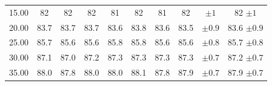 \documentclass[11pt]{article}
\begin{document}
\begin{table}[h]
\begin{tabular}{cccccccccc}
15.00                                                 & 82                                             & 82                                             & 82                                             & 81                                             & 82                                             & 81                                             & 82                                             & $\pm 1$                                                          & 82 $\pm 1$                                                     \\
\rowcolor[HTML]{EFEFEF} 
20.00                                                 & 83.7                                             & 83.7                                             & 83.7                                             & 83.6                                             & 83.8                                             & 83.6                                             & 83.5                                             & $\pm 0.9$                                                          & 83.6  $\pm 0.9$                                                    \\
25.00                                                 & 85.7                                             & 85.6                                             & 85.6                                             & 85.8                                             & 85.8                                             & 85.6                                             & 85.6                                             & $\pm 0.8$                                                          & 85.7 $\pm 0.8$                                                     \\
\rowcolor[HTML]{EFEFEF} 
30.00                                                 & 87.1                                             & 87.0                                             & 87.2                                             & 87.3                                             & 87.3                                             & 87.3                                             & 87.3                                             & $\pm 0.7$                                                          & 87.2 $\pm 0.7$                                                     \\
35.00                                                 & \multicolumn{1}{r}{88.0}                         & \multicolumn{1}{r}{87.8}                         & \multicolumn{1}{r}{88.0}                         & \multicolumn{1}{r}{88.0}                         & \multicolumn{1}{r}{88.1}                         & \multicolumn{1}{r}{87.8}                         & \multicolumn{1}{r}{87.9}                         & $\pm 0.7$                                                          & 87.9 $\pm 0.7$                                                     \\

\end{tabular}
\end{table}
\end{document}
